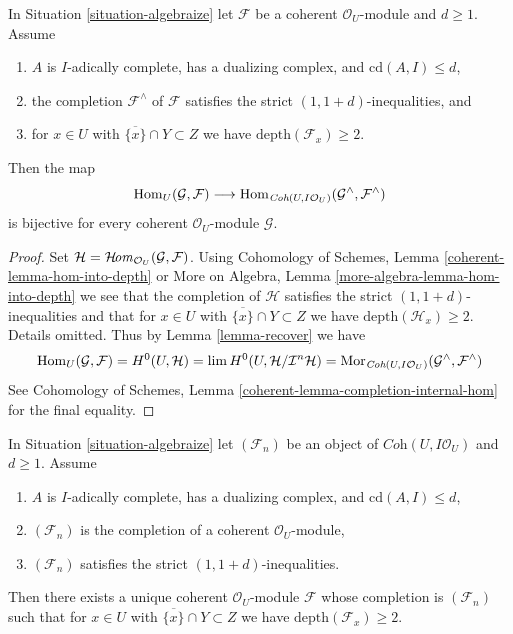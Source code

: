 \begin{lemma}
\label{lemma-fully-faithful-inequalities}
In Situation \ref{situation-algebraize} let $\mathcal{F}$ be a
coherent $\mathcal{O}_U$-module and $d \geq 1$. Assume
\begin{enumerate}
\item $A$ is $I$-adically complete, has a dualizing complex, and
$\text{cd}(A, I) \leq d$,
\item the completion $\mathcal{F}^\wedge$ of $\mathcal{F}$
satisfies the strict $(1, 1 + d)$-inequalities, and
\item for $x \in U$ with $\overline{\{x\}} \cap Y \subset Z$
we have $\text{depth}(\mathcal{F}_x) \geq 2$.
\end{enumerate}
Then the map
$$
\mathop{\mathrm{Hom}}\nolimits_U(\mathcal{G}, \mathcal{F})
\longrightarrow
\mathop{\mathrm{Hom}}\nolimits_{\textit{Coh}(U, I\mathcal{O}_U)}(\mathcal{G}^\wedge, \mathcal{F}^\wedge)
$$
is bijective for every coherent $\mathcal{O}_U$-module $\mathcal{G}$. 
\end{lemma}

\begin{proof}
Set $\mathcal{H} = \mathop{\mathcal{H}\!\mathit{om}}\nolimits_{\mathcal{O}_U}(\mathcal{G}, \mathcal{F})$.
Using Cohomology of Schemes, Lemma
\ref{coherent-lemma-hom-into-depth} or
More on Algebra, Lemma \ref{more-algebra-lemma-hom-into-depth}
we see that the completion of $\mathcal{H}$
satisfies the strict $(1, 1 + d)$-inequalities and that for
$x \in U$ with $\overline{\{x\}} \cap Y \subset Z$
we have $\text{depth}(\mathcal{H}_x) \geq 2$. Details omitted.
Thus by Lemma \ref{lemma-recover} we have
$$
\mathop{\mathrm{Hom}}\nolimits_U(\mathcal{G}, \mathcal{F}) =
H^0(U, \mathcal{H}) =
\mathop{\mathrm{lim}}\nolimits H^0(U, \mathcal{H}/\mathcal{I}^n\mathcal{H}) =
\mathop{\mathrm{Mor}}\nolimits_{\textit{Coh}(U, I\mathcal{O}_U)}
(\mathcal{G}^\wedge, \mathcal{F}^\wedge)
$$
See Cohomology of Schemes, Lemma \ref{coherent-lemma-completion-internal-hom}
for the final equality.
\end{proof}

\begin{lemma}
\label{lemma-construct-unique}
In Situation \ref{situation-algebraize} let $(\mathcal{F}_n)$ be an
object of $\textit{Coh}(U, I\mathcal{O}_U)$ and $d \geq 1$. Assume
\begin{enumerate}
\item $A$ is $I$-adically complete, has a dualizing complex, and
$\text{cd}(A, I) \leq d$,
\item $(\mathcal{F}_n)$ is the completion of a coherent $\mathcal{O}_U$-module,
\item $(\mathcal{F}_n)$ satisfies the strict $(1, 1 + d)$-inequalities.
\end{enumerate}
Then there exists a unique coherent $\mathcal{O}_U$-module $\mathcal{F}$
whose completion is $(\mathcal{F}_n)$ such that for
$x \in U$ with $\overline{\{x\}} \cap Y \subset Z$
we have $\text{depth}(\mathcal{F}_x) \geq 2$.
\end{lemma}

